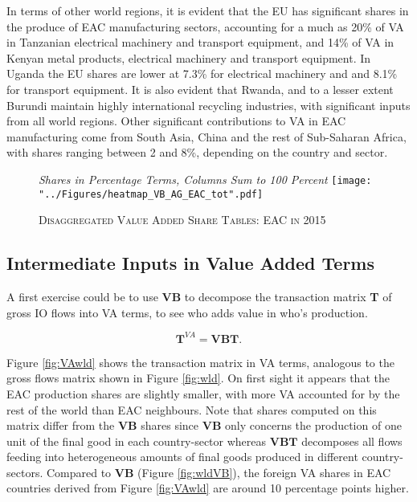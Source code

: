 \documentclass[a4paper]{article}
\begin{document}
In terms of other world regions, it is evident that the EU has significant shares in the produce of EAC manufacturing sectors, accounting for a much as 20\% of VA in Tanzanian electrical machinery and transport equipment, and 14\% of VA in Kenyan metal products, electrical machinery and transport equipment. In Uganda the EU shares are lower at 7.3\% for electrical machinery and  and 8.1\% for transport equipment. It is also evident that Rwanda, and to a lesser extent Burundi maintain highly international recycling industries, with significant inputs from all world regions. Other significant contributions to VA in EAC manufacturing come from South Asia, China and the rest of Sub-Saharan Africa, with shares ranging between 2 and 8\%, depending on the country and sector. 

\begin{figure}[h!]
\centering
\caption{\label{fig:eacVB}\textsc{Disaggregated Value Added Share Tables: EAC in 2015}}
\small{\textit{Shares in Percentage Terms, Columns Sum to 100 Percent}}
\texttt{[image: "../Figures/heatmap\_VB\_AG\_EAC\_tot".pdf]} %
\end{figure}
\FloatBarrier

\subsection{Intermediate Inputs in Value Added Terms}

A first exercise could be to use \textbf{VB} to decompose the transaction matrix \textbf{T} of gross IO flows into VA terms, to see who adds value in who's production.  

\begin{equation}
\textbf{T}^{VA} = \textbf{VB} \textbf{T}.
\end{equation} 

Figure \ref{fig:VAwld} shows the transaction matrix in VA terms, analogous to the gross flows matrix shown in Figure \ref{fig:wld}. On first sight it appears that the EAC production shares are slightly smaller, with more VA accounted for by the rest of the world than EAC neighbours. Note that shares computed on this matrix differ from the \textbf{VB} shares since \textbf{VB} only concerns the production of one unit of the final good in each country-sector whereas $\textbf{VB} \textbf{T}$ decomposes all flows feeding into heterogeneous amounts of final goods produced in different country-sectors. Compared to  \textbf{VB} (Figure \ref{fig:wldVB}), the foreign VA shares in EAC countries derived from Figure \ref{fig:VAwld} are around 10 percentage points higher. 
\end{document}
